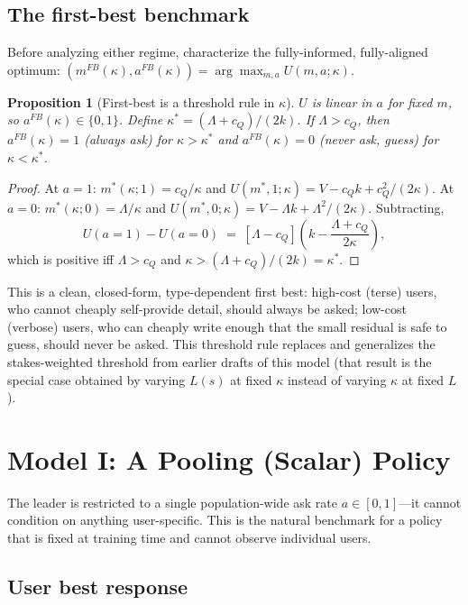 \documentclass[11pt]{article}
\newtheorem{proposition}{Proposition}
\begin{document}
\subsection{The first-best benchmark}
\label{sec:firstbest}

Before analyzing either regime, characterize the fully-informed, fully-aligned
optimum: $(m^{FB}(\kappa), a^{FB}(\kappa)) = \arg\max_{m,a} U(m,a;\kappa)$.

\begin{proposition}[First-best is a threshold rule in $\kappa$]\label{prop:firstbest}
$U$ is linear in $a$ for fixed $m$, so $a^{FB}(\kappa) \in \{0,1\}$. Define
$\kappa^* = (\Lambda+c_Q)/(2k)$. If $\Lambda > c_Q$, then $a^{FB}(\kappa)=1$
(always ask) for $\kappa > \kappa^*$ and $a^{FB}(\kappa)=0$ (never ask, guess) for
$\kappa < \kappa^*$.
\end{proposition}

\begin{proof}
At $a=1$: $m^*(\kappa;1)=c_Q/\kappa$ and $U(m^*,1;\kappa)=V-c_Qk+c_Q^2/(2\kappa)$.
At $a=0$: $m^*(\kappa;0)=\Lambda/\kappa$ and
$U(m^*,0;\kappa)=V-\Lambda k+\Lambda^2/(2\kappa)$. Subtracting,
\[
U(a{=}1)-U(a{=}0) \;=\; [\Lambda-c_Q]\left(k - \frac{\Lambda+c_Q}{2\kappa}\right),
\]
which is positive iff $\Lambda>c_Q$ and $\kappa>(\Lambda+c_Q)/(2k)=\kappa^*$.
\end{proof}

This is a clean, closed-form, type-dependent first best: high-cost (terse) users,
who cannot cheaply self-provide detail, should always be asked; low-cost (verbose)
users, who can cheaply write enough that the small residual is safe to guess,
should never be asked. This threshold rule replaces and generalizes the
stakes-weighted threshold from earlier drafts of this model (that result is the
special case obtained by varying $L(s)$ at fixed $\kappa$ instead of varying
$\kappa$ at fixed $L$).

\section{Model I: A Pooling (Scalar) Policy}
\label{sec:model1}

The leader is restricted to a single population-wide ask rate $a\in[0,1]$---it
cannot condition on anything user-specific. This is the natural benchmark for a
policy that is fixed at training time and cannot observe individual users.

\subsection{User best response}
\end{document}
